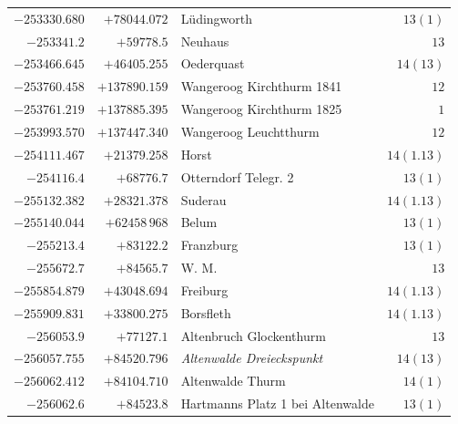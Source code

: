 \begin{center}
\begin{tabular}{r|r|p{170pt}|r}
\(-253330.680\)&\(+78044.072\)&Lüdingworth&\(13(1)\)\\
\(-253341.2\)&\(+59778.5\)&Neuhaus&\(13\)\\
\(-253466.645\)&\(+46405.255\)&Oederquast&\(14(13)\)\\
\(-253760.458\)&\(+137890.159\)&Wangeroog Kirchthurm 1841&\(12\)\\
\(-253761.219\)&\(+137885.395\)&Wangeroog Kirchthurm 1825&\(1\)\\
\(-253993.570\)&\(+137447.340\)&Wangeroog Leuchtthurm&\(12\)\\
\(-254111.467\)&\(+21379.258\)&Horst&\(14(1.13)\)\\
\(-254116.4\)&\(+68776.7\)&Otterndorf Telegr. 2&\(13(1)\)\\
\(-255132.382\)&\(+28321.378\)&Suderau&\(14(1.13)\)\\
\(-255140.044\)&\(+62458\,968\)&Belum&\(13(1)\)\\
\(-255213.4\)&\(+83122.2\)&Franzburg&\(13(1)\)\\
\(-255672.7\)&\(+84565.7\)&W. M.&\(13\)\\
\(-255854.879\)&\(+43048.694\)&Freiburg&\(14(1.13)\)\\
\(-255909.831\)&\(+33800.275\)&Borsfleth&\(14(1.13)\)\\
\(-256053.9\)&\(+77127.1\)&Altenbruch Glockenthurm&\(13\)\\
\(-256057.755\)&\(+84520.796\)&\textit{Altenwalde Dreieckspunkt}&\(14(13)\)\\
\(-256062.412\)&\(+84104.710\)&Altenwalde Thurm&\(14(1)\)\\
\(-256062.6\)&\(+84523.8\)&Hartmanns Platz 1 bei Altenwalde&\(13(1)\)\\
\hline\end{tabular}\endgroup\end{center}
